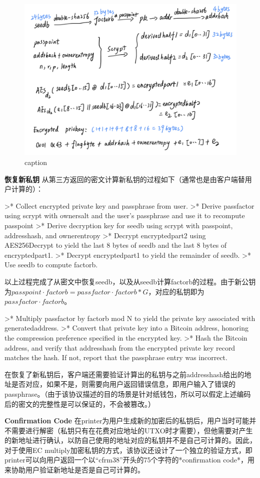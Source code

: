 \documentclass{article}
\begin{document}
\begin{figure}[h]
\centering
\includegraphics[width=.7\textwidth]{./ec.png}
\caption{caption}\label{fig-parsesig}
\end{figure}

\textbf{恢复新私钥}
从第三方返回的密文计算新私钥的过程如下（通常也是由客户端替用户计算的）：

>* Collect encrypted private key and passphrase from user.
>* Derive passfactor using scrypt with ownersalt and the user's passphrase and use it to recompute passpoint
>* Derive decryption key for seedb using scrypt with passpoint, addresshash, and ownerentropy
>* Decrypt encryptedpart2 using AES256Decrypt to yield the last 8 bytes of seedb and the last 8 bytes of encryptedpart1.
>* Decrypt encryptedpart1 to yield the remainder of seedb.
>* Use seedb to compute factorb.

以上过程完成了从密文中恢复seedb，以及从seedb计算factorb的过程。由于新公钥为$passpoint\cdot factorb=passfactor\cdot factorb *G$，对应的私钥即为$passfactor\cdot factorb$。

>* Multiply passfactor by factorb mod N to yield the private key associated with generatedaddress.
>* Convert that private key into a Bitcoin address, honoring the compression preference specified in the encrypted key.
>* Hash the Bitcoin address, and verify that addresshash from the encrypted private key record matches the hash. If not, report that the passphrase entry was incorrect.

在恢复了新私钥后，客户端还需要验证计算出的私钥与之前addresshash给出的地址是否对应，如果不是，则需要向用户返回错误信息，即用户输入了错误的passphrase。（由于该协议描述的目的场景是针对纸钱包，所以可以假定上述编码后的密文的完整性是可以保证的，不会被篡改。）

\textbf{ Confirmation Code}
在printer为用户生成新的加密后的私钥后，用户当时可能并不需要进行解密（私钥只有在花费对应地址的UTXO时才需要），但他需要对产生的新地址进行确认，以防自己使用的地址对应的私钥并不是自己可计算的。因此，对于使用EC multiply加密私钥的方式，该协议还设计了一个独立的验证方式，即printer可以向用户返回一个以“cfrm38”开头的75个字符的*confirmation code*，用来协助用户验证新地址是否是自己可计算的。
 
\end{document}
